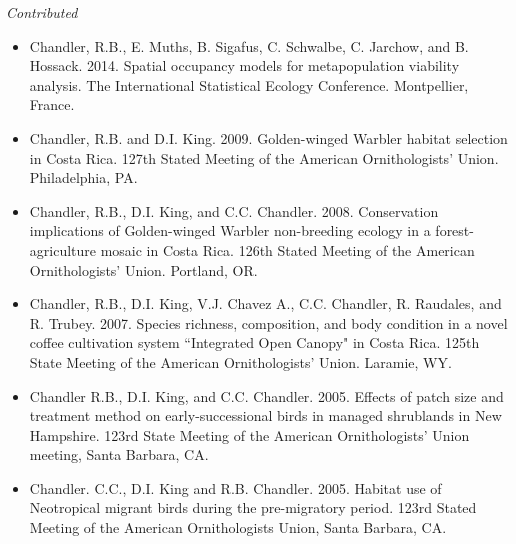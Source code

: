 
\emph{Contributed}

\begin{itemize}


\item Chandler, R.B., E. Muths, B. Sigafus, C. Schwalbe, C. Jarchow,
  and B. Hossack. 2014. Spatial occupancy models for metapopulation
  viability analysis. The International Statistical Ecology
  Conference. Montpellier, France.

\item Chandler, R.B. and D.I. King. 2009. Golden-winged Warbler
  habitat selection in Costa Rica. 127th Stated Meeting of the
  American Ornithologists’ Union. Philadelphia, PA.

\item Chandler, R.B., D.I. King, and
  C.C. Chandler. 2008. Conservation implications of Golden-winged
  Warbler non-breeding ecology in a forest-agriculture mosaic in Costa
  Rica. 126th Stated Meeting of the American Ornithologists’
  Union. Portland, OR.

\item Chandler, R.B., D.I. King, V.J. Chavez A., C.C. Chandler,
  R. Raudales, and R. Trubey. 2007. Species richness, composition, and
  body condition in a novel coffee cultivation system ``Integrated Open
  Canopy" in Costa Rica. 125th State Meeting of the American
  Ornithologists’ Union. Laramie, WY.



\item Chandler R.B., D.I. King, and C.C. Chandler. 2005. Effects of
  patch size and treatment method on early-successional birds in
  managed shrublands in New Hampshire. 123rd State Meeting of the
  American Ornithologists’ Union meeting, Santa Barbara, CA.

\item Chandler. C.C., D.I. King and R.B. Chandler. 2005. Habitat use
  of Neotropical migrant birds during the pre-migratory period.
  123rd Stated Meeting of the American Ornithologists Union, Santa
  Barbara, CA.

\end{itemize}




